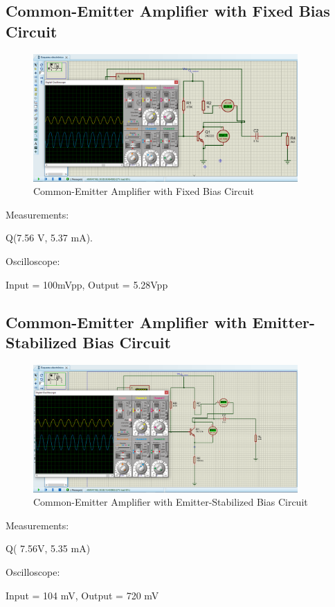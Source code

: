 \subsection{Common-Emitter Amplifier with Fixed Bias Circuit}

\begin{figure}[H]
    \centering
    \includegraphics[width = 0.9\textwidth]{Imagenes/Imagenes_Juan/Circuito1_Simulado.PNG}
    \caption{Common-Emitter Amplifier with Fixed Bias Circuit}
    \label{circuit1Simulated}
\end{figure}

Measurements:
\begin{center}
    Q(7.56 V, 5.37 mA).
    
\end{center}
Oscilloscope:

\begin{center}
    Input = 100mVpp, Output = 5.28Vpp
\end{center}

\newpage

\subsection{Common-Emitter Amplifier with Emitter-Stabilized Bias Circuit}

\begin{figure}[H]
    \centering
    \includegraphics[width = 0.9\textwidth]{Imagenes/Imagenes_Juan/Circuito2_Simulado.PNG}
    \caption{Common-Emitter Amplifier with Emitter-Stabilized Bias Circuit}
    \label{circuit2Simulated}
\end{figure}

Measurements:
\begin{center}
    Q( 7.56V, 5.35 mA)
\end{center}

Oscilloscope:

\begin{center}
    Input = 104 mV, Output = 720 mV
\end{center}